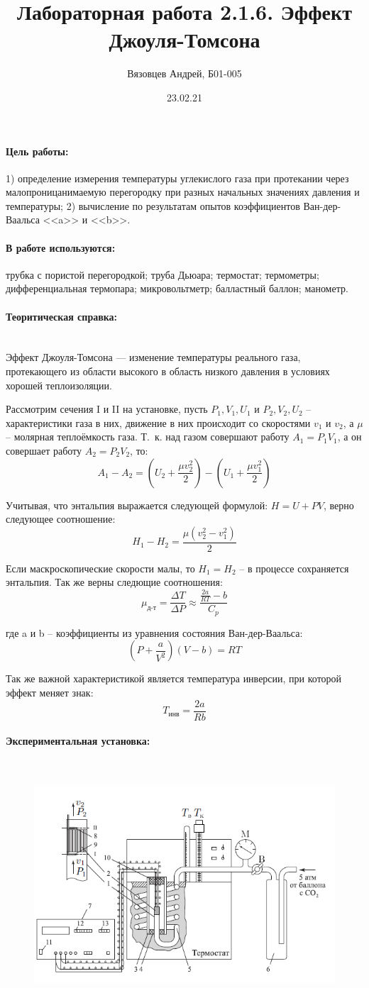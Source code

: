 \documentclass[a4paper, 12pt]{article}
\author{Вязовцев Андрей, Б01-005}
\date{23.02.21}
\title{Лабораторная работа 2.1.6. Эффект Джоуля-Томсона}
\newcommand{\parag}[1]{\paragraph*{#1:}}
\begin{document}
\maketitle

\parag {Цель работы}
1) определение измерения температуры углекислого газа при протекании через малопроницанимаемую перегородку при разных начальных значениях давления и температуры; 2) вычисление по результатам опытов коэффициентов Ван-дер-Ваальса <<a>> и <<b>>.

\parag {В работе используются}
трубка с пористой перегородкой; труба Дьюара; термостат; термометры; дифференциальная термопара; микровольтметр; балластный баллон; манометр.

\parag {Теоритическая справка} ~\\

Эффект Джоуля-Томсона --- изменение температуры реального газа, протекающего из области высокого в область низкого давления в условиях хорошей теплоизоляции. 

Рассмотрим сечения I и II на установке, пусть $P_1, V_1, U_1$ и $P_2, V_2, U_2$ -- характеристики газа в них, движение в них происходит со скоростями $v_1$ и $v_2$, а $\mu$ -- молярная теплоёмкость газа. Т.~к. над газом совершают работу $A_1 = P_1 V_1$, а он совершает работу $A_2 = P_2 V_2$, то:
\[
    A_1 - A_2 = \left(U_2 + \frac {\mu v_2^2}{2}\right) - \left(U_1 + \frac {\mu v_1^2}{2}\right)
\]

Учитывая, что энтальпия выражается следующей формулой: $H = U + PV$, верно следующее соотношение:
\[
    H_1 - H_2 = \frac{\mu (v_2^2 - v_1^2)}{2}
\]

Если маскроскопические скорости малы, то $H_1 = H_2$ -- в процессе сохраняется энтальпия. Так же верны следющие соотношения:
\[
    \mu_{\text{д-т}} = \frac{\Delta T}{\Delta P} \approx \frac{\frac{2a}{RT} - b}{C_p}
\]

где a и b -- коэффициенты из уравнения состояния Ван-дер-Ваальса:
\[
    \left(P + \frac{a}{V^2}\right)(V - b) = RT
\]

Так же важной характеристикой является температура инверсии, при которой эффект меняет знак:
\[T_{\text{инв}} = \frac{2a}{Rb}\]

\parag {Экспериментальная установка} ~

\begin{figure}[!h]
    \includegraphics[scale = 0.5]{Workplace}
\end{figure}
\end{document}

